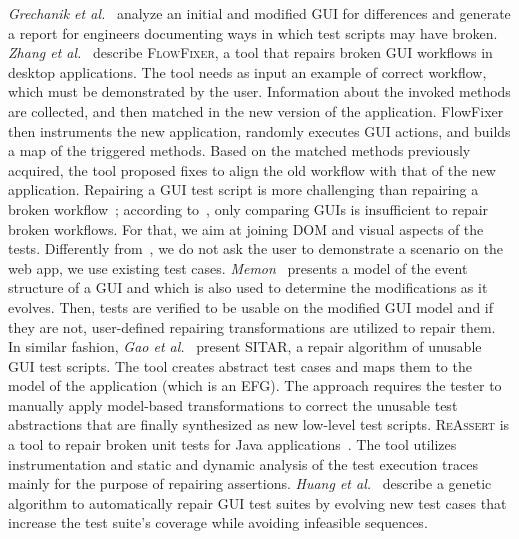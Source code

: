 \textit{Grechanik et al.}~\cite{Grechanik:2009:MEG:1555001.1555055} analyze an initial and modified GUI for differences and generate a report for engineers documenting ways in which test scripts may have broken.
\textit{Zhang et al.}~\cite{Zhang:2013:ARB:2483760.2483775} describe \textsc{FlowFixer}, a tool that repairs broken GUI workflows in desktop applications. The tool needs as input an example of correct workflow, which must be demonstrated by the user. Information about the invoked methods are collected, and then matched in the new version of the application. FlowFixer then instruments the new application, randomly executes GUI actions, and builds a map of the triggered methods. Based on the matched methods previously acquired, the tool proposed fixes to align the old workflow with that of the new application.
Repairing a GUI test script is more challenging than repairing a broken workflow~\cite{Zhang:2013:ARB:2483760.2483775}; 
according to~\cite{Zhang:2013:ARB:2483760.2483775}, only comparing GUIs is insufficient to repair broken workflows. For that, we aim at joining DOM and visual aspects of the tests.
Differently from~\cite{Zhang:2013:ARB:2483760.2483775}, we do not ask the user to demonstrate a scenario on the web app, we use existing test cases. 
\textit{Memon}~\cite{Memon:2008:ARE:1416563.1416564} presents a model of the event structure of a GUI and which is also used to determine the modifications as it evolves. Then, tests are verified to be usable on the modified GUI model and if they are not, user-defined repairing transformations are utilized to repair them. In similar fashion, \textit{Gao et al.}~\cite{Gao:2016:SGT:3046547.3046580} present \textsc{SITAR}, a repair algorithm of unusable GUI test scripts. The tool creates abstract test cases and maps them to the model of the application (which is an EFG). The approach requires the tester to manually apply model-based transformations to correct the unusable test abstractions that are finally synthesized as new low-level test scripts. 
\textsc{ReAssert} is a tool to repair broken unit tests for Java applications~\cite{Daniel:2011:AGR:2002931.2002937,Daniel:2011:RTR:1985793.1985978,Daniel:2009:RSR:1747491.1747538,Daniel:2010:TRU:1831708.1831734}. The tool utilizes instrumentation and static and dynamic analysis of the test execution traces mainly for the purpose of repairing assertions. 
\textit{Huang et al.}~\cite{Huang:2010:RGT:1828417.1828465} describe a genetic algorithm to automatically repair GUI test suites by evolving new test cases that increase the test suite's coverage while avoiding infeasible sequences.

